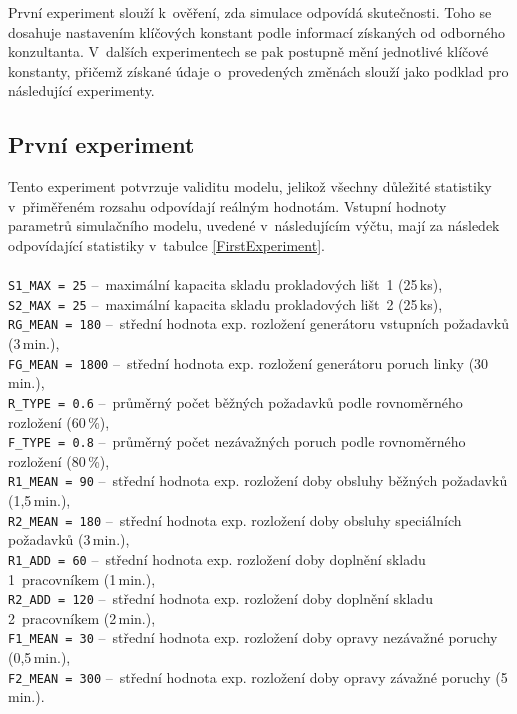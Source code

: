 \documentclass[a4paper, 11pt]{article}
\begin{document}
První experiment slouží k~ověření, zda simulace odpovídá skutečnosti.
Toho se dosahuje nastavením klíčových konstant podle informací získaných od odborného konzultanta.
V~dalších experimentech se pak postupně mění jednotlivé klíčové konstanty, přičemž získané údaje o~provedených změnách slouží jako podklad pro následující experimenty.

\subsection{První experiment}

Tento experiment potvrzuje validitu modelu, jelikož všechny důležité statistiky v~přiměřeném rozsahu odpovídají reálným hodnotám.
Vstupní hodnoty parametrů simulačního modelu, uvedené v~následujícím výčtu, mají za následek odpovídající statistiky v~tabulce \ref{FirstExperiment}.\\ \\
\texttt{S1\_MAX = 25} --~maximální kapacita skladu prokladových lišt~1 (25\,ks),\\
\texttt{S2\_MAX = 25} --~maximální kapacita skladu prokladových lišt~2 (25\,ks),\\
\texttt{RG\_MEAN = 180} --~střední hodnota exp. rozložení generátoru vstupních požadavků (3\,min.),\\
\texttt{FG\_MEAN = 1800} --~střední hodnota exp. rozložení generátoru poruch linky (30\,min.),\\
\texttt{R\_TYPE = 0.6} --~průměrný počet běžných požadavků podle rovnoměrného rozložení (60\,\%),\\
\texttt{F\_TYPE = 0.8} --~průměrný počet nezávažných poruch podle rovnoměrného rozložení (80\,\%),\\
\texttt{R1\_MEAN = 90} --~střední hodnota exp. rozložení doby obsluhy běžných požadavků (1,5\,min.),\\
\texttt{R2\_MEAN = 180} --~střední hodnota exp. rozložení doby obsluhy speciálních požadavků (3\,min.),\\
\texttt{R1\_ADD = 60} --~střední hodnota exp. rozložení doby doplnění skladu 1~pracovníkem (1\,min.),\\
\texttt{R2\_ADD = 120} --~střední hodnota exp. rozložení doby doplnění skladu 2~pracovníkem (2\,min.),\\
\texttt{F1\_MEAN = 30} --~střední hodnota exp. rozložení doby opravy nezávažné poruchy (0,5\,min.),\\
\texttt{F2\_MEAN = 300} --~střední hodnota exp. rozložení doby opravy závažné poruchy (5\,min.).
\end{document}
